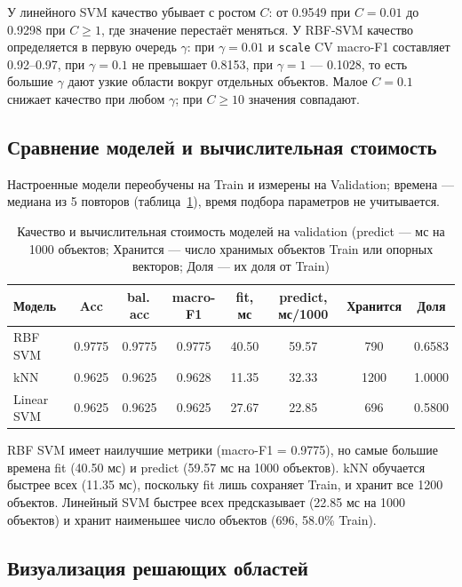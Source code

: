 \documentclass[14pt,a4paper]{extarticle}
\begin{document}
У линейного SVM качество убывает с ростом $C$: от 0.9549 при $C=0.01$ до 0.9298 при $C\ge 1$, где значение перестаёт меняться. У RBF-SVM качество определяется в первую очередь $\gamma$: при $\gamma=0.01$ и \texttt{scale} CV macro-F1 составляет 0.92--0.97, при $\gamma=0.1$ не превышает 0.8153, при $\gamma=1$ --- 0.1028, то есть большие $\gamma$ дают узкие области вокруг отдельных объектов. Малое $C=0.1$ снижает качество при любом $\gamma$; при $C\ge 10$ значения совпадают.

\subsection{Сравнение моделей и вычислительная стоимость}

Настроенные модели переобучены на Train и измерены на Validation; времена --- медиана из 5 повторов (таблица~\ref{tab:cost}), время подбора параметров не учитывается.

\begin{table}[h!]
\centering
\footnotesize\setlength{\tabcolsep}{3pt}
\begin{tabular}{lccccccc}
\toprule
Модель & Acc & bal.\,acc & macro-F1 & fit, мс & predict, мс/1000 & Хранится & Доля \\
\midrule
RBF SVM    & 0.9775 & 0.9775 & 0.9775 & 40.50 & 59.57 & 790  & 0.6583 \\
kNN        & 0.9625 & 0.9625 & 0.9628 & 11.35 & 32.33 & 1200 & 1.0000 \\
Linear SVM & 0.9625 & 0.9625 & 0.9625 & 27.67 & 22.85 & 696  & 0.5800 \\
\bottomrule
\end{tabular}
\caption{Качество и вычислительная стоимость моделей на validation (predict --- мс на 1000 объектов; Хранится --- число хранимых объектов Train или опорных векторов; Доля --- их доля от Train)}
\label{tab:cost}
\end{table}

RBF SVM имеет наилучшие метрики (macro-F1 = 0.9775), но самые большие времена fit (40.50 мс) и predict (59.57 мс на 1000 объектов). kNN обучается быстрее всех (11.35 мс), поскольку fit лишь сохраняет Train, и хранит все 1200 объектов. Линейный SVM быстрее всех предсказывает (22.85 мс на 1000 объектов) и хранит наименьшее число объектов (696, 58.0\% Train).

\subsection{Визуализация решающих областей}
\end{document}
